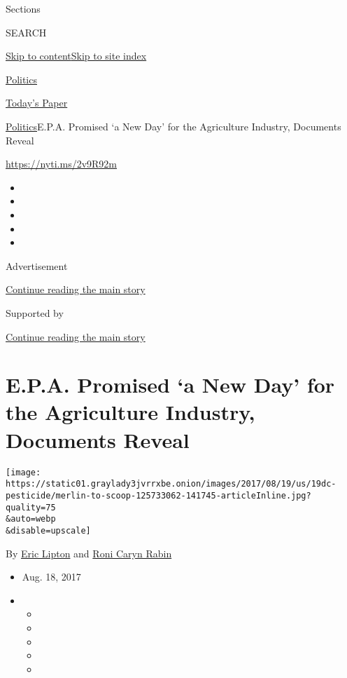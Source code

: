 Sections

SEARCH

\protect\hyperlink{site-content}{Skip to
content}\protect\hyperlink{site-index}{Skip to site index}

\href{https://www.nytimes3xbfgragh.onion/section/politics}{Politics}

\href{https://myaccount.nytimes3xbfgragh.onion/auth/login?response_type=cookie\&client_id=vi}{}

\href{https://www.nytimes3xbfgragh.onion/section/todayspaper}{Today's
Paper}

\href{/section/politics}{Politics}\textbar{}E.P.A. Promised `a New Day'
for the Agriculture Industry, Documents Reveal

\url{https://nyti.ms/2v9R92m}

\begin{itemize}
\item
\item
\item
\item
\item
\end{itemize}

Advertisement

\protect\hyperlink{after-top}{Continue reading the main story}

Supported by

\protect\hyperlink{after-sponsor}{Continue reading the main story}

\hypertarget{epa-promised-a-new-day-for-the-agriculture-industry-documents-reveal}{%
\section{E.P.A. Promised `a New Day' for the Agriculture Industry,
Documents
Reveal}\label{epa-promised-a-new-day-for-the-agriculture-industry-documents-reveal}}

\texttt{[image: https://static01.graylady3jvrrxbe.onion/images/2017/08/19/us/19dc-pesticide/merlin-to-scoop-125733062-141745-articleInline.jpg?quality=75\\\&auto=webp\\\&disable=upscale]}

By \href{http://www.nytimes3xbfgragh.onion/by/eric-lipton}{Eric Lipton}
and \href{http://www.nytimes3xbfgragh.onion/by/roni-caryn-rabin}{Roni
Caryn Rabin}

\begin{itemize}
\item
  Aug. 18, 2017
\item
  \begin{itemize}
  \item
  \item
  \item
  \item
  \item
  \end{itemize}
\end{itemize}

